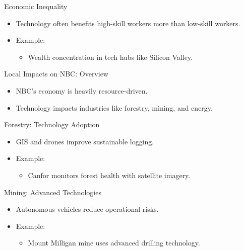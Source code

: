 \documentclass{beamer}
\begin{document}
\begin{frame}{Economic Inequality}
    \begin{itemize}
        \item Technology often benefits high-skill workers more than low-skill workers.
        \item Example:
        \begin{itemize}
            \item Wealth concentration in tech hubs like Silicon Valley.
        \end{itemize}
    \end{itemize}
\end{frame}

\begin{frame}{Local Impacts on NBC: Overview}
    \begin{itemize}
        \item NBC's economy is heavily resource-driven.
        \item Technology impacts industries like forestry, mining, and energy.
    \end{itemize}
\end{frame}

\begin{frame}{Forestry: Technology Adoption}
    \begin{itemize}
        \item GIS and drones improve sustainable logging.
        \item Example:
        \begin{itemize}
            \item Canfor monitors forest health with satellite imagery.
        \end{itemize}
    \end{itemize}
\end{frame}

\begin{frame}{Mining: Advanced Technologies}
    \begin{itemize}
        \item Autonomous vehicles reduce operational risks.
        \item Example:
        \begin{itemize}
            \item Mount Milligan mine uses advanced drilling technology.
        \end{itemize}
    \end{itemize}
\end{frame}
\end{document}
